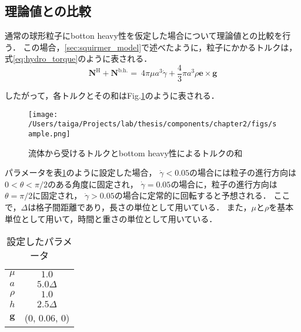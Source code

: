 \subsection{理論値との比較}
通常の球形粒子にbotton heavy性を仮定した場合について理論値との比較を行う．
この場合，\ref{sec:squirmer_model}で述べたように，粒子にかかるトルクは，式\eqref{eq:hydro_torque}のように表される．
    \begin{equation}
        \boldsymbol{N}^\mathrm{H} + \boldsymbol{N}^\mathrm{b.h.} = \
        4 \pi \mu a^3 \dot{\gamma} + \frac{4}{3} \pi a^3 \rho \boldsymbol{e} \times \boldsymbol{g}
        \label{eq:hydro_torque}
    \end{equation}

\noindent
したがって，各トルクとその和はFig.\ref{fig:sum_of_torque}のように表される．

    \begin{figure}[htbp]
        \centering
        \texttt{[image: /Users/taiga/Projects/lab/thesis/components/chapter2/figs/sample.png]}
        \caption{流体から受けるトルクとbottom heavy性によるトルクの和}
        \label{fig:sum_of_torque}
    \end{figure}

\noindent
パラメータを表\ref{tab:parameters}のように設定した場合，
$\dot{\gamma} < 0.05$の場合には粒子の進行方向は$0 < \theta < \pi / 2$のある角度に固定され，
$\dot{\gamma} = 0.05$の場合に，粒子の進行方向は$\theta = \pi /2$に固定され，
$\dot{\gamma} > 0.05$の場合に定常的に回転すると予想される．
ここで，$\Delta$は格子間距離であり，長さの単位として用いている．
また，$\mu$と$\rho$を基本単位として用いて，時間と重さの単位として用いている．

\begin{table}[htbp]
    \centering
    \caption{設定したパラメータ}
    \label{tab:parameters}
    \begin{tabular}{cc}
        \hline
        $\mu$ & $1.0$ \\
        $a$ & $5.0 \Delta$ \\
        $\rho$ & $1.0$ \\
        $h$ & $2.5\Delta$ \\
        $\boldsymbol{g}$ & (0, 0.06, 0) \\
        \hline
    \end{tabular}
\end{table}
